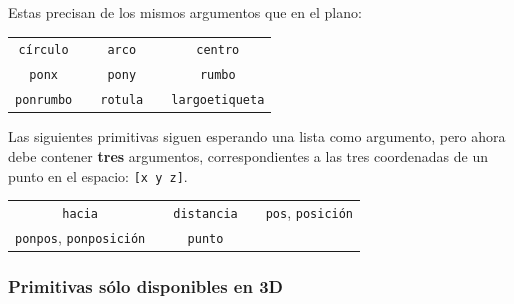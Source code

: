 \noindent Estas precisan de los mismos argumentos que en el plano:
\begin{center}\begin{tabular}{ccccc}
   \texttt{c\'irculo}\index{c\'irculo@\texttt{c\'irculo}}    & &
   \texttt{arco}\index{arco@\texttt{arco}}             & &
   \texttt{centro}\index{centro@\texttt{centro}}       \\
   \texttt{ponx}\index{ponx@\texttt{ponx}}             & &
   \texttt{pony}\index{pony@\texttt{pony}}             & &
   \texttt{rumbo}\index{rumbo@\texttt{rumbo}}          \\
   \texttt{ponrumbo}\index{ponrumbo@\texttt{ponrumbo}} & &
   \texttt{rotula}\index{rotula@\texttt{rotula}}       & &
   \texttt{largoetiqueta}\index{largoetiqueta@\texttt{largoetiqueta}}
\end{tabular}\end{center}

\noindent Las siguientes primitivas siguen esperando una lista como
argumento, pero ahora debe contener \textbf{tres} argumentos,
correspondientes a las tres coordenadas de un punto en el espacio:
\texttt{[x y z]}.
\begin{center}\begin{tabular}{ccccc}
   \texttt{hacia}\index{hacia@\texttt{hacia}}              & &
   \texttt{distancia}\index{distancia@\texttt{distancia}}  & &
   \texttt{pos}, \texttt{posici\'on}
      \index{posici\'on@\texttt{posici\'on}}\index{pos@\texttt{pos}} \\
   \texttt{ponpos}, \texttt{ponposici\'on}
      \index{ponposici\'on@\texttt{ponposici\'on}}\index{ponpos@\texttt{ponpos}} & &
   \texttt{punto} \index{punto@\texttt{punto}}              & &
\end{tabular}\end{center}

\subsubsection{Primitivas s\'olo disponibles en 3D}

